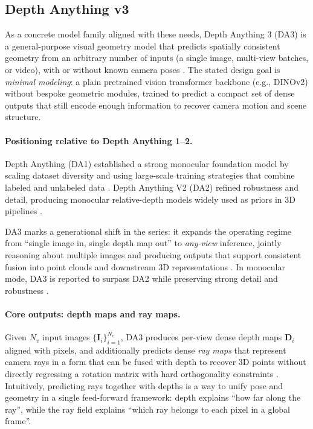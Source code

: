 \subsection{Depth Anything v3}
As a concrete model family aligned with these needs, Depth Anything 3 (DA3) is a general-purpose visual geometry model that predicts spatially consistent geometry from an arbitrary number of inputs (a single image, multi-view batches, or video), with or without known camera poses \cite{lin2025depthanything3}. The stated design goal is \emph{minimal modeling}: a plain pretrained vision transformer backbone (e.g., DINOv2) without bespoke geometric modules, trained to predict a compact set of dense outputs that still encode enough information to recover camera motion and scene structure.

\paragraph{Positioning relative to Depth Anything 1--2.}
Depth Anything (DA1) established a strong monocular foundation model by scaling dataset diversity and using large-scale training strategies that combine labeled and unlabeled data \cite{yang2024depth}. Depth Anything V2 (DA2) refined robustness and detail, producing monocular relative-depth models widely used as priors in 3D pipelines \cite{yang2024depthanythingv2}.

DA3 marks a generational shift in the series: it expands the operating regime from ``single image in, single depth map out'' to \emph{any-view} inference, jointly reasoning about multiple images and producing outputs that support consistent fusion into point clouds and downstream 3D representations \cite{lin2025depthanything3}. In monocular mode, DA3 is reported to surpass DA2 while preserving strong detail and robustness \cite{lin2025depthanything3}.

\paragraph{Core outputs: depth maps and ray maps.}
Given $N_v$ input images $\{\mathbf{I}_i\}_{i=1}^{N_v}$, DA3 produces per-view dense depth maps $\mathbf{D}_i$ aligned with pixels, and additionally predicts dense \emph{ray maps} that represent camera rays in a form that can be fused with depth to recover 3D points without directly regressing a rotation matrix with hard orthogonality constraints \cite{lin2025depthanything3}. Intuitively, predicting rays together with depths is a way to unify pose and geometry in a single feed-forward framework: depth explains ``how far along the ray'', while the ray field explains ``which ray belongs to each pixel in a global frame''.

